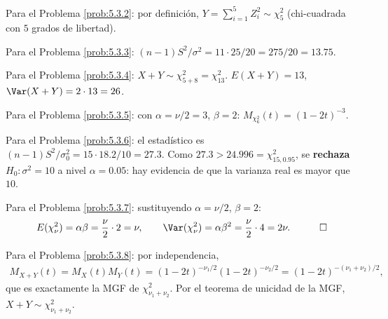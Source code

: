 \begin{solucion}
	\label{sol:5.3.2}
	Para el Problema \ref{prob:5.3.2}: por definición, $Y=\sum_{i=1}^5 Z_i^2 \sim \chi^2_5$ (chi-cuadrada con $5$ grados de libertad). \quad \qedhere
\end{solucion}

\begin{solucion}
	\label{sol:5.3.3}
	Para el Problema \ref{prob:5.3.3}: $(n-1)S^2/\sigma^2 = 11\cdot 25/20 = 275/20 = 13.75$. \quad \qedhere
\end{solucion}

\begin{solucion}
	\label{sol:5.3.4}
	Para el Problema \ref{prob:5.3.4}: $X+Y \sim \chi^2_{5+8} = \chi^2_{13}$. $E(X+Y)=13$, $\Var(X+Y)=2\cdot 13=26$. \quad \qedhere
\end{solucion}

\begin{solucion}
	\label{sol:5.3.5}
	Para el Problema \ref{prob:5.3.5}: con $\alpha=\nu/2=3$, $\beta=2$: $M_{\chi^2_6}(t) = (1-2t)^{-3}$. \quad \qedhere
\end{solucion}

\begin{solucion}
	\label{sol:5.3.6}
	Para el Problema \ref{prob:5.3.6}: el estadístico es $(n-1)S^2/\sigma_0^2 = 15\cdot 18.2/10 = 27.3$. Como $27.3 > 24.996 = \chi^2_{15,0.95}$, se \textbf{rechaza} $H_0:\sigma^2=10$ a nivel $\alpha=0.05$: hay evidencia de que la varianza real es mayor que $10$. \quad \qedhere
\end{solucion}

\begin{solucion}
	\label{sol:5.3.7}
	Para el Problema \ref{prob:5.3.7}: sustituyendo $\alpha=\nu/2$, $\beta=2$:
	\begin{align*}
		E(\chi^2_\nu) = \alpha\beta = \frac{\nu}{2}\cdot 2 = \nu, \qquad
		\Var(\chi^2_\nu) = \alpha\beta^2 = \frac{\nu}{2}\cdot 4 = 2\nu. \quad \qedhere
	\end{align*}
\end{solucion}

\begin{solucion}
	\label{sol:5.3.8}
	Para el Problema \ref{prob:5.3.8}: por independencia,
	\begin{align*}
		M_{X+Y}(t) = M_X(t)M_Y(t) = (1-2t)^{-\nu_1/2}(1-2t)^{-\nu_2/2} = (1-2t)^{-(\nu_1+\nu_2)/2},
	\end{align*}
	que es exactamente la MGF de $\chi^2_{\nu_1+\nu_2}$. Por el teorema de unicidad de la MGF, $X+Y\sim\chi^2_{\nu_1+\nu_2}$. \quad \qedhere
\end{solucion}

